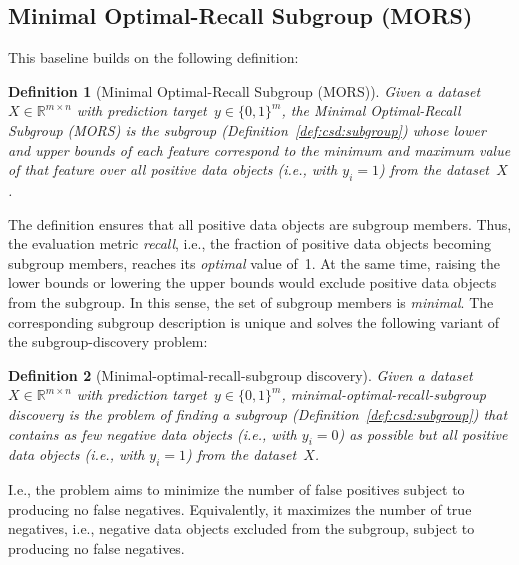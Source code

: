 \documentclass[acmsmall]{acmart} %
\theoremstyle{acmplain}
\theoremstyle{acmdefinition}
\newtheorem{definition}{Definition}
\begin{document}
\subsection{Minimal Optimal-Recall Subgroup (MORS)}
\label{sec:csd:baselines:mors}

This baseline builds on the following definition:
%
\begin{definition}[Minimal Optimal-Recall Subgroup (MORS)]
	Given a dataset $X \in \mathbb{R}^{m \times n}$ with prediction target~$y \in \{0, 1\}^m$,
	the \emph{Minimal Optimal-Recall Subgroup (MORS)} is the subgroup (Definition~\ref{def:csd:subgroup}) whose lower and upper bounds of each feature correspond to the minimum and maximum value of that feature over all positive data objects (i.e., with $y_i = 1$) from the dataset~$X$.
	\label{def:csd:mors}
\end{definition}
%
The definition ensures that all positive data objects are subgroup members.
Thus, the evaluation metric \emph{recall}, i.e., the fraction of positive data objects becoming subgroup members, reaches its \emph{optimal} value of~1.
At the same time, raising the lower bounds or lowering the upper bounds would exclude positive data objects from the subgroup.
In this sense, the set of subgroup members is \emph{minimal}.
The corresponding subgroup description is unique and solves the following variant of the subgroup-discovery problem:
%
\begin{definition}[Minimal-optimal-recall-subgroup discovery]
	Given a dataset $X \in \mathbb{R}^{m \times n}$ with prediction target~$y \in \{0, 1\}^m$,
	\emph{minimal-optimal-recall-subgroup discovery} is the problem of finding a subgroup (Definition~\ref{def:csd:subgroup}) that contains as few negative data objects (i.e., with $y_i = 0$) as possible but all positive data objects (i.e., with $y_i = 1$) from the dataset~$X$.
	\label{def:csd:minimal-optimal-recall-subgroup-discovery}
\end{definition}
%
I.e., the problem aims to minimize the number of false positives subject to producing no false negatives.
Equivalently, it maximizes the number of true negatives, i.e., negative data objects excluded from the subgroup, subject to producing no false negatives.
\end{document}
